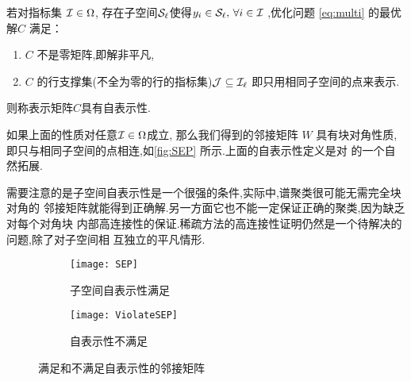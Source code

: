 \begin{definition}[子空间自表示性]\label{def:lasso_detection}
  若对指标集 \(\mathcal{I}\in \Omega\), 存在子空间\(\mathcal{S}_\ell\)使得\(y_i\in \mathcal{S}_\ell,\,
  \forall i \in \mathcal{I}\) ,优化问题 \eqref{eq:multi} 的最优解\(C\) 满足：
  \begin{enumerate}
    \item \(C\) 不是零矩阵,即解非平凡,
    \item \(C\) 的行支撑集(不全为零的行的指标集)\(\mathcal{J}\subseteq \mathcal{I}_\ell\)
      即只用相同子空间的点来表示.
  \end{enumerate}
  则称表示矩阵\(C\)具有自表示性.
\end{definition}

如果上面的性质对任意\(\mathcal{I} \in \Omega\)成立, 那么我们得到的邻接矩阵 \(W\)
具有块对角性质,即只与相同子空间的点相连,如\autoref{fig:SEP} 
所示.上面的自表示性定义是对 \cite[定义~1.1]{elhamifar2013sparse}
的一个自然拓展.

需要注意的是子空间自表示性是一个很强的条件,实际中,谱聚类很可能无需完全块对角的
邻接矩阵就能得到正确解.另一方面它也不能一定保证正确的聚类,因为缺乏对每个对角块
内部高连接性的保证.稀疏方法的高连接性证明仍然是一个待解决的问题,除了对子空间相
互独立的平凡情形\cite{liu2013robust, wang2013provable}.
\begin{figure}[tb]
  \centering
  \begin{subfigure}[b]{0.4\textwidth}
    \texttt{[image: SEP]}
    \caption{子空间自表示性满足}
  \end{subfigure}
  \begin{subfigure}[b]{0.4\textwidth}
    \texttt{[image: ViolateSEP]}
    \caption{自表示性不满足}
  \end{subfigure}
  \caption{满足和不满足自表示性的邻接矩阵}
  \label{fig:SEP}
\end{figure}

